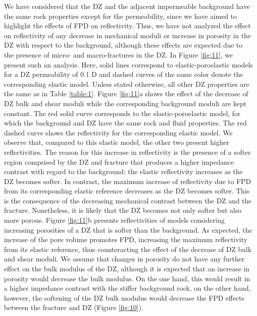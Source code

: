 \documentclass[draft]{agujournal2019}
\begin{document}
We  have considered that the DZ and the adjacent impermeable background have the same rock properties except for the permeability, since we  have aimed to highlight the effects of FPD on reflectivity.
Thus, we have not analyzed the effect on reflectivity of any  decrease in mechanical moduli or increase in porosity in the DZ with respect to the background, although these effects are expected due to the presence of micro- and macro-fractures in the DZ. In Figure \ref{fig:11}, we present such an analysis. Here, solid lines correspond to elastic-poroelastic models for a DZ permeability of 0.1 D and dashed curves of the same color denote the corresponding elastic model. Unless stated otherwise, all other DZ properties are the same as in Table \ref{table:1}.
Figure \ref{fig:11}a shows the effect of the decrease of DZ bulk and shear moduli while the corresponding background moduli are kept constant. The red solid curve corresponds to the elastic-poroelastic model, for which the background and DZ have the same rock and fluid properties. The red dashed curve shows the reflectivity for the corresponding elastic model.
We observe that, compared to this elastic model, the other two present higher reflectivities.
The reason for this increase in reflectivity is the presence of a softer region comprised by the DZ and fracture that produces a higher impedance contrast with regard to the background: the elastic reflectivity increases as the DZ becomes softer. In contrast,  the maximum increase of reflectivity due to FPD from its corresponding elastic reference decreases as the DZ becomes softer. This is the consequence of the decreasing mechanical contrast between the DZ and the fracture. Nonetheless, it is likely that the DZ becomes not only softer but also more porous. Figure \ref{fig:11}b presents reflectivities of models considering  increasing porosities of a DZ that is softer than the background. As expected, the increase of the pore volume promotes FPD, increasing the maximum reflectivity from its elastic reference, thus counteracting the effect of the decrease of DZ bulk and shear moduli.
We assume that changes in porosity do not have any further effect on the bulk modulus of the DZ, although it is expected that an increase in porosity would decrease the bulk modulus. On the one hand, this would result in a higher impedance contrast with the stiffer background rock, on the other hand, however,  the softening of the DZ bulk modulus would decrease the FPD effects between the fracture and DZ (Figure  \ref{fig:10}).
\end{document}

